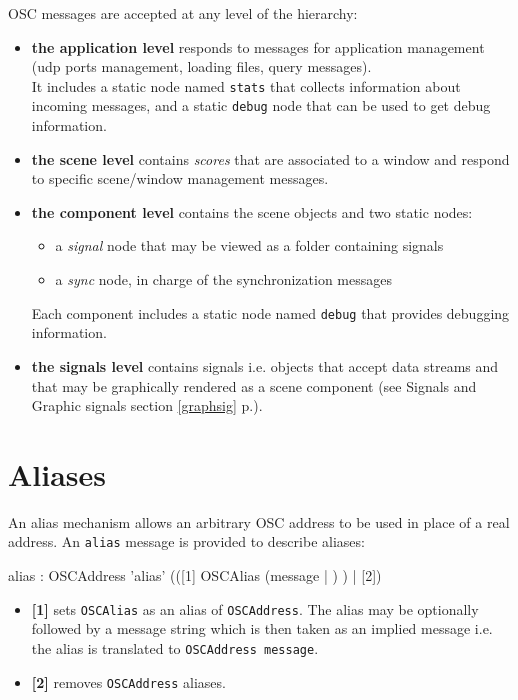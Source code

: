 \documentclass[a4paper,twoside]{report}
\newcommand{\sublevel}[1]	{\section{#1}}
\newcommand{\fullref}[1]	{\ref{#1} p.\pageref{#1}}
\newcommand{\OSC}[1]		{\texttt{#1}}
\begin{document}
OSC messages are accepted at any level of the hierarchy:
\begin{itemize}
\item \textbf{the application level} responds to messages for application management (udp ports management, loading files, query messages). \\
It includes a static node named \OSC{stats} that collects information about incoming messages, and a static \OSC{debug} node that can be used to get debug information.
\item \textbf{the scene level} contains \emph{scores} that are associated to a window and respond to specific scene/window management messages.
\item \textbf{the component level} contains the scene objects and two static nodes:

\begin{itemize}
\item a \emph{signal} node that may be viewed as a folder containing signals
\item a \emph{sync} node, in charge of the synchronization messages
\end{itemize}

Each component includes a static node named \OSC{debug} that provides debugging information.
\item \textbf{the signals level} contains signals i.e. objects that accept data streams and that may be graphically rendered as a scene component (see Signals and Graphic signals section \fullref{graphsig}).

\end{itemize}


\sublevel{Aliases}
\label{alias}
An alias mechanism allows an arbitrary OSC address to be used in place of a real address. An \OSC{alias} message is provided to describe aliases: 
\begin{rail}
alias : OSCAddress 'alias' (([1] OSCAlias (message | ) ) | [2])
\end{rail}
\begin{itemize}
\item \textbf{[1]} sets \OSC{OSCAlias} as an alias of \OSC{OSCAddress}. The alias may be optionally followed by a message string which is then taken as an implied message i.e. the alias is translated to \OSC{OSCAddress message}.
\item \textbf{[2]} removes \OSC{OSCAddress} aliases.
\end{itemize}
\end{document}
